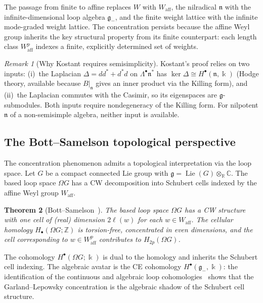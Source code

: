 \documentclass[11pt,reqno]{amsart}
\theoremstyle{plain}
\newtheorem{theorem}{Theorem}[section]
\theoremstyle{definition}
\theoremstyle{remark}
\newtheorem{remark}[theorem]{Remark}
\newcommand{\fg}{\mathfrak{g}}
\newcommand{\fn}{\mathfrak{n}}
\newcommand{\Waff}{W_{\mathrm{aff}}}
\newcommand{\gminus}{\fg_{-}}
\newcommand{\ZZ}{\mathbb{Z}}
\newcommand{\CC}{\mathbb{C}}
\newcommand{\kk}{\Bbbk}
\begin{document}
The passage from finite to affine replaces $W$ with $\Waff$, the
nilradical $\fn$ with the infinite-dimensional loop algebra $\gminus$,
and the finite weight lattice with the infinite mode-graded weight lattice.
The concentration persists because the affine Weyl group inherits the
key structural property from its finite counterpart: each length class
$\Waff^p$ indexes a finite, explicitly determined set of weights.

\begin{remark}[Why Kostant requires semisimplicity]\label{rem:kostant-ss}
 Kostant's proof relies on two inputs: (i)~the Laplacian $\Delta =
 d d^* + d^* d$ on $\Lambda^\bullet \fn^*$ has $\ker \Delta \cong
 H^\bullet(\fn, \kk)$ (Hodge theory, available because $B|_\fn$ gives
 an inner product via the Killing form), and (ii)~the Laplacian commutes
 with the Casimir, so its eigenspaces are $\fg$-submodules. Both inputs
 require nondegeneracy of the Killing form. For nilpotent $\fn$ of a
 non-semisimple algebra, neither input is available.
\end{remark}


\subsection{The Bott--Samelson topological perspective}
\label{sec:bott-samelson}

The concentration phenomenon admits a topological interpretation via the
loop space. Let $G$ be a compact connected Lie group with $\fg = \operatorname{Lie}(G)
\otimes_\mathbb{R} \CC$. The based loop space $\Omega G$ has a CW
decomposition into Schubert cells indexed by the affine Weyl group $\Waff$.

\begin{theorem}[Bott--Samelson~\cite{BottSamelson58}]\label{thm:bott-samelson}
 The based loop space $\Omega G$ has a CW structure with one cell of
 (real) dimension $2\ell(w)$ for each $w \in \Waff$. The cellular
 homology $H_\bullet(\Omega G; \ZZ)$ is torsion-free, concentrated
 in even dimensions, and the cell corresponding to $w \in \Waff^p$
 contributes to $H_{2p}(\Omega G)$.
\end{theorem}

The cohomology $H^\bullet(\Omega G; \kk)$ is dual to the homology and
inherits the Schubert cell indexing. The algebraic avatar is the CE
cohomology $H^\bullet(\gminus, \kk)$: the identification of the
continuous and algebraic loop cohomologies~\cite[Chapter~11]{Kumar02}
shows that the Garland--Lepowsky concentration is the algebraic shadow
of the Schubert cell structure.
\end{document}

